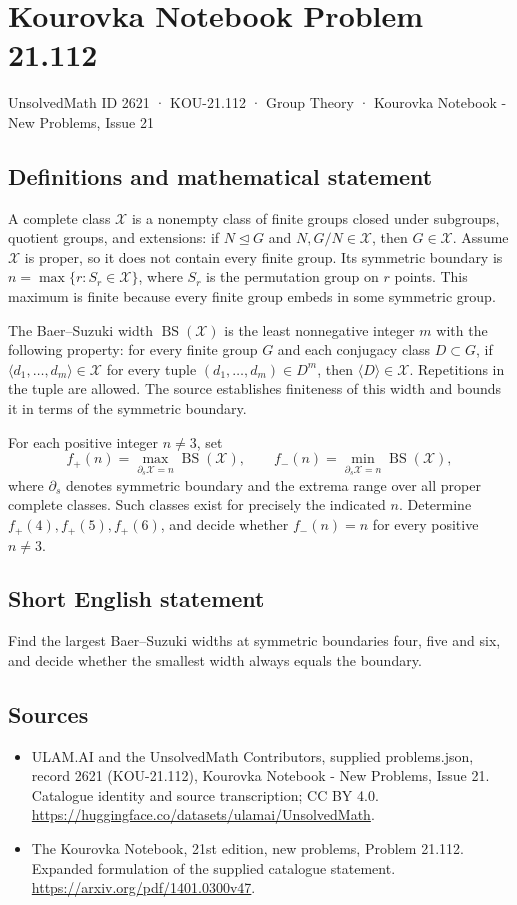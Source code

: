 \documentclass[11pt,a4paper]{article}
\begin{document}
\section*{Kourovka Notebook Problem 21.112}\label{2621}
{\small UnsolvedMath ID 2621 · KOU-21.112 · Group Theory · Kourovka Notebook - New Problems, Issue 21}
\subsection{Definitions and mathematical statement}
A complete class $\mathcal X$ is a nonempty class of finite groups closed under
subgroups, quotient groups, and extensions: if $N\trianglelefteq G$ and
$N,G/N\in\mathcal X$, then $G\in\mathcal X$.
Assume $\mathcal X$ is proper, so it does not contain every finite group.
Its symmetric boundary is $n=\max\{r:S_r\in\mathcal X\}$, where $S_r$ is
the permutation group on $r$ points. This maximum is finite because every
finite group embeds in some symmetric group.

The Baer--Suzuki width $\operatorname{BS}(\mathcal X)$ is the least
nonnegative integer $m$ with the following property: for every finite group
$G$ and each conjugacy class $D\subset G$, if
$\langle d_1,\ldots,d_m\rangle\in\mathcal X$ for every tuple
$(d_1,\ldots,d_m)\in D^m$, then $\langle D\rangle\in\mathcal X$.
Repetitions in the tuple are allowed. The source establishes finiteness of
this width and bounds it in terms of the symmetric boundary.

For each positive integer $n\ne3$, set
\[
f_+(n)=\max_{\partial_s\mathcal X=n}\operatorname{BS}(\mathcal X),\qquad
f_-(n)=\min_{\partial_s\mathcal X=n}\operatorname{BS}(\mathcal X),
\]
where $\partial_s$ denotes symmetric boundary and the extrema range over all
proper complete classes. Such classes exist for precisely the indicated $n$.
Determine $f_+(4),f_+(5),f_+(6)$, and decide whether $f_-(n)=n$ for every
positive $n\ne3$.
\subsection{Short English statement}
Find the largest Baer--Suzuki widths at symmetric boundaries four, five and six, and decide whether the smallest width always equals the boundary.
\subsection{Sources}
\begin{itemize}
\item[S1] ULAM.AI and the UnsolvedMath Contributors, supplied problems.json, record 2621 (KOU-21.112), Kourovka Notebook - New Problems, Issue 21. Catalogue identity and source transcription; CC BY 4.0.
\url{https://huggingface.co/datasets/ulamai/UnsolvedMath}.
\item[S2] The Kourovka Notebook, 21st edition, new problems, Problem 21.112. Expanded formulation of the supplied catalogue statement.
\url{https://arxiv.org/pdf/1401.0300v47}.
\end{itemize}
\end{document}
